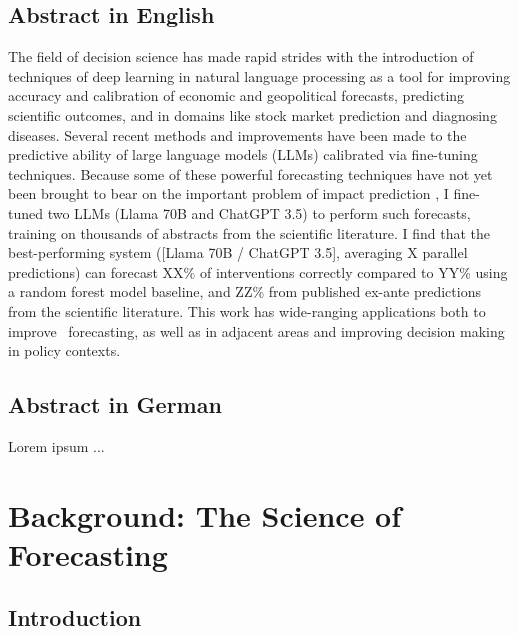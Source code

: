 \documentclass[12pt,a4paper]{article}
\begin{document}
\subsection*{Abstract in English}
The field of decision science has made rapid strides with the introduction of techniques of deep learning in natural language processing as a tool for improving accuracy and calibration of economic and geopolitical forecasts, predicting scientific outcomes, and in domains like stock market prediction and diagnosing diseases. Several recent methods and improvements have been made to the predictive ability of large language models (LLMs) calibrated via fine-tuning techniques. Because some of these powerful forecasting techniques have not yet been brought to bear on the important problem of impact prediction \ABSTRACT, I fine-tuned two LLMs (Llama 70B and ChatGPT 3.5) to perform such forecasts, training on thousands of abstracts from the scientific literature. I find that the best-performing system ([Llama 70B / ChatGPT 3.5], averaging X parallel predictions) can forecast XX\% of interventions correctly compared to YY\% using a random forest model baseline, and ZZ\% from published ex-ante predictions from the scientific literature. This work has wide-ranging applications both to improve \DOMAIN\ forecasting, as well as in adjacent areas and improving decision making in policy contexts.

\subsection*{Abstract in German}
Lorem ipsum ...
\clearpage

\setcounter{page}{1}
\tableofcontents
\clearpage

\setcounter{page}{1}





















\section{Background: The Science of Forecasting}
\subsection{Introduction}
\end{document}
